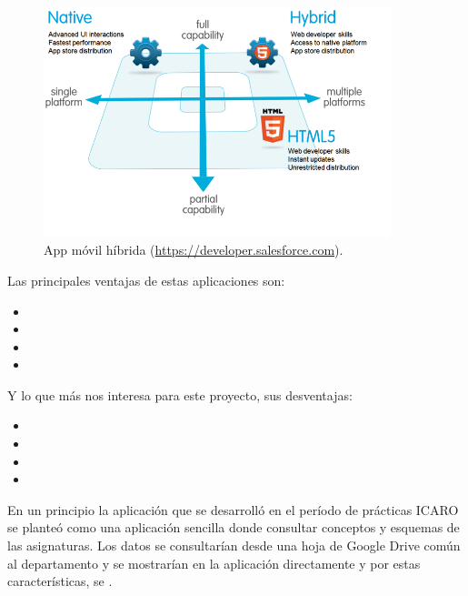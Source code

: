 \begin{figure}[!ht]
  \begin{center}
  \includegraphics[width=0.9\textwidth]{../images/compare_hybrid_app.png}
  \caption[App híbrida]{App móvil híbrida (\href{https://developer.salesforce.com}{https://developer.salesforce.com}).}
  \label{fig:compare_hybrid_app}
  \end{center}
\end{figure}

Las principales ventajas de estas aplicaciones son:

\begin{itemize}
  \item {}
  \item {}
  \item {}
  \item {}
\end{itemize}


\bigskip
Y lo que más nos interesa para este proyecto, sus desventajas:

\begin{itemize}
  \item {}
  \item {}
  \item {}
  \item {}
\end{itemize}


\bigskip
En un principio la aplicación que se desarrolló en el período de prácticas ICARO se planteó como una aplicación sencilla donde consultar conceptos y esquemas de las asignaturas. Los datos se consultarían desde una hoja de Google Drive común al departamento y se mostrarían en la aplicación directamente y por estas características, se .

